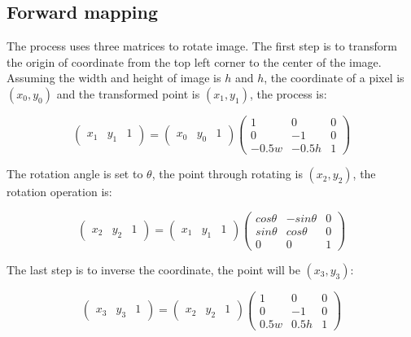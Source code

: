 \documentclass[hyperref]{article}
\theoremstyle{nonumberplain}
\begin{document}
	\subsection{Forward mapping}
	
	\hspace{1.0em}
	The process uses three matrices to rotate image. The first step is to transform the origin of coordinate from the top left corner to the center of the image. Assuming the width and height of image is $h$ and $h$, the coordinate of a pixel is $(x_{0},y_{0})$ and the transformed point is $(x_{1},y_{1})$, the process is:
	
	\begin{equation}
		\begin{pmatrix}
		x_{1} &y_{1}  &1 
		\end{pmatrix}=\begin{pmatrix}
		x_{0} &y_{0}  &1 
		\end{pmatrix}\begin{pmatrix}
		1 &0  &0 \\ 
		0 &-1  &0 \\ 
		-0.5w &-0.5h  &1 
		\end{pmatrix}
		\label{eq21}
	\end{equation}
	
	The rotation angle is set to $\theta$, the point through rotating is $(x_{2},y_{2})$, the rotation operation is:
	
	\begin{equation}
	\begin{pmatrix}
	x_{2} &y_{2}  &1 
	\end{pmatrix}=\begin{pmatrix}
	x_{1} &y_{1}  &1 
	\end{pmatrix}\begin{pmatrix}
	cos\theta &-sin\theta  &0 \\ 
	sin\theta &cos\theta  &0 \\ 
	0 &0  &1 
	\end{pmatrix}
	\label{eq22}
	\end{equation}
	
	The last step is to inverse the coordinate, the point will be $(x_{3},y_{3})$:
	
	\begin{equation}
	\begin{pmatrix}
	x_{3} &y_{3}  &1 
	\end{pmatrix}=\begin{pmatrix}
	x_{2} &y_{2}  &1 
	\end{pmatrix}\begin{pmatrix}
	1 &0  &0 \\ 
	0 &-1  &0 \\ 
	0.5w &0.5h  &1 
	\end{pmatrix}
	\label{eq23}
	\end{equation}
	
\end{document}
